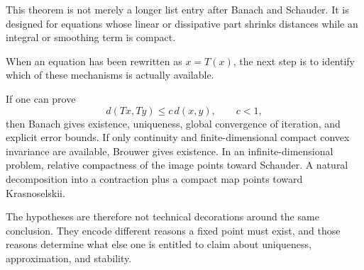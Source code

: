 This theorem is not merely a longer list entry after Banach and Schauder.  It is designed for equations whose linear or dissipative part shrinks distances while an integral or smoothing term is compact.

When an equation has been rewritten as \(x=T(x)\), the next step is to identify which of these mechanisms is actually available.

If one can prove
\[
  d(Tx,Ty)\le c\,d(x,y),
  \qquad c<1,
\]
then Banach gives existence, uniqueness, global convergence of iteration, and explicit error bounds.  If only continuity and finite-dimensional compact convex invariance are available, Brouwer gives existence.  In an infinite-dimensional problem, relative compactness of the image points toward Schauder.  A natural decomposition into a contraction plus a compact map points toward Krasnoselskii.

The hypotheses are therefore not technical decorations around the same conclusion.  They encode different reasons a fixed point must exist, and those reasons determine what else one is entitled to claim about uniqueness, approximation, and stability.